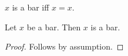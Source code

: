 \begin{definition}\label{set}
    $x$ is a bar iff $x = x$.
\end{definition}

\begin{proposition}\label{phase5_marker_only_set_noun}
    Let $x$ be a bar.
    Then $x$ is a bar.
\end{proposition}
\begin{proof}
    Follows by assumption.
\end{proof}
